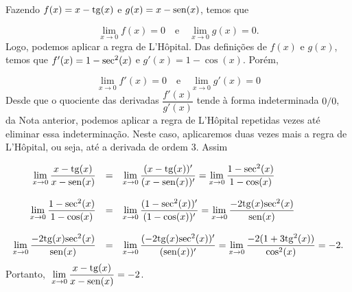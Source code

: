 \cleardoublepage\documentclass[../main.tex]{subfiles}
\begin{document}
\begin{exeresol}
\begin{compactenum}[a)]
  \begin{resol}
  Fazendo \(f(x)=x-{\rm tg}(x)\) e \(g(x)=x-{\rm sen}(x)\), temos que

\[ \lim \limits_{x\to 0}f(x)=0 \quad \mbox{e}\quad \lim \limits_{x\to 0}g(x)=0. \]
Logo, podemos aplicar a regra de L’Hôpital. Das definições de \(f(x)\) e \(g(x)\), temos que \(f'(x)=1-{\rm sec}^2(x)\) e \(g'(x)=1-\cos(x)\). Porém,

\[ \lim \limits_{x\to 0}f'(x)=0 \quad \mbox{e}\quad \lim \limits_{x\to 0}g'(x)=0 \]
Desde que o quociente das derivadas \(\dfrac{f'(x)}{g'(x)}\) tende à forma indeterminada \(0/0\), da Nota anterior, podemos aplicar a regra de L’Hôpital repetidas vezes até eliminar essa indeterminação. Neste caso, aplicaremos duas vezes mais a regra de L’Hôpital, ou seja, até a derivada de ordem \(3\). Assim

\[ \begin{array}{rcl} \lim \limits_{x\to 0}\dfrac{x-{\rm tg}(x)}{x-{\rm sen}(x)}&=&\lim \limits_{x\to 0}\dfrac{(x-{\rm tg}(x))'}{(x-{\rm sen}(x))'}=\lim \limits_{x\to 0}\dfrac{1-{\rm sec}^2(x)}{1-\cos(x)}\\\\ \lim \limits_{x\to 0}\dfrac{1-{\rm sec}^2(x)}{1-\cos(x)}&=&\lim \limits_{x\to 0}\dfrac{(1-{\rm sec}^2(x))'}{(1-\cos(x))'}=\lim \limits_{x\to 0}\dfrac{-2{\rm tg}(x){\rm sec}^2(x)}{{\rm sen}(x)} \\\\ \lim \limits_{x\to 0}\dfrac{-2{\rm tg}(x){\rm sec}^2(x)}{{\rm sen}(x)}&=&\lim \limits_{x\to 0}\dfrac{(-2{\rm tg}(x){\rm sec}^2(x))'}{({\rm sen}(x))'}=\lim \limits_{x\to 0}\dfrac{-2(1+3{\rm tg}^2(x))}{\cos^2(x)}=-2. \end{array} \]
Portanto, \(\,\,\lim \limits_{x\to 0}\dfrac{x-{\rm tg}(x)}{x-{\rm sen}(x)}=-2\).
  \end{resol}
   
  \end{compactenum}
  \end{exeresol}
\end{document}
